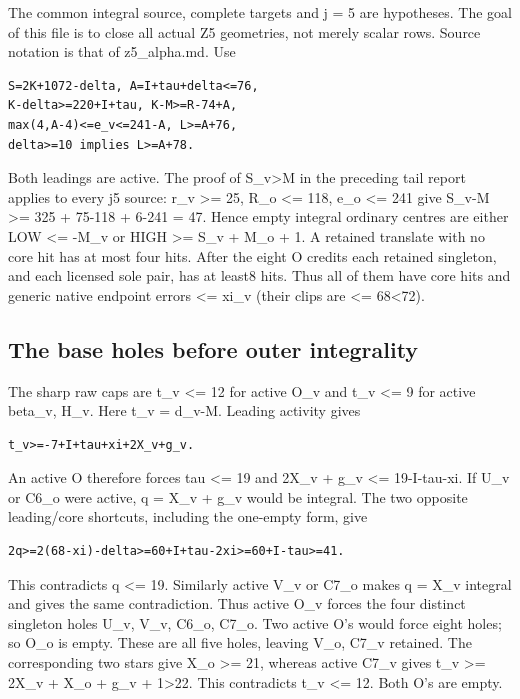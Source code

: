 \documentclass[11pt,a4paper]{article}
\begin{document}
The common integral source, complete targets and j = 5 are hypotheses.
The goal of this file is to close all actual Z5 geometries, not merely
scalar rows. Source notation is that of z5\_alpha.md. Use

\begin{verbatim}
S=2K+1072-delta, A=I+tau+delta<=76,
K-delta>=220+I+tau, K-M>=R-74+A,
max(4,A-4)<=e_v<=241-A, L>=A+76,
delta>=10 implies L>=A+78.
\end{verbatim}

Both leadings are active. The proof of S\_v\textgreater M in the
preceding tail report applies to every j5 source: r\_v \textgreater= 25,
R\_o \textless= 118, e\_o \textless= 241 give S\_v-M \textgreater= 325 +
75-118 + 6-241 = 47. Hence empty integral ordinary centres are either
LOW \textless= -M\_v or HIGH \textgreater= S\_v + M\_o + 1. A retained
translate with no core hit has at most four hits. After the eight O
credits each retained singleton, and each licensed sole pair, has at
least8 hits. Thus all of them have core hits and generic native endpoint
errors \textless= xi\_v (their clips are \textless= 68\textless72).

\hypertarget{the-base-holes-before-outer-integrality}{%
\subsection{The base holes before outer
integrality}\label{the-base-holes-before-outer-integrality}}

The sharp raw caps are t\_v \textless= 12 for active O\_v and t\_v
\textless= 9 for active beta\_v, H\_v. Here t\_v = d\_v-M. Leading
activity gives

\begin{verbatim}
t_v>=-7+I+tau+xi+2X_v+g_v.
\end{verbatim}

An active O therefore forces tau \textless= 19 and 2X\_v + g\_v
\textless= 19-I-tau-xi. If U\_v or C6\_o were active, q = X\_v + g\_v
would be integral. The two opposite leading/core shortcuts, including
the one-empty form, give

\begin{verbatim}
2q>=2(68-xi)-delta>=60+I+tau-2xi>=60+I-tau>=41.
\end{verbatim}

This contradicts q \textless= 19. Similarly active V\_v or C7\_o makes q
= X\_v integral and gives the same contradiction. Thus active O\_v
forces the four distinct singleton holes U\_v, V\_v, C6\_o, C7\_o. Two
active O's would force eight holes; so O\_o is empty. These are all five
holes, leaving V\_o, C7\_v retained. The corresponding two stars give
X\_o \textgreater= 21, whereas active C7\_v gives t\_v \textgreater=
2X\_v + X\_o + g\_v + 1\textgreater22. This contradicts t\_v \textless=
12. Both O's are empty.
\end{document}
